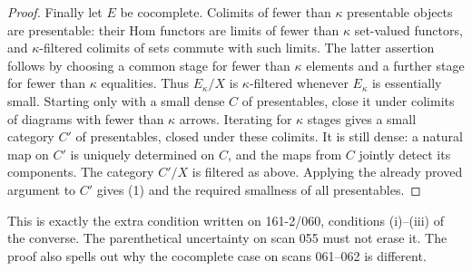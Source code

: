 \begin{proof}
Finally let $E$ be cocomplete.  Colimits of fewer than $\kappa$
presentable objects are presentable: their Hom functors are limits of
fewer than $\kappa$ set-valued functors, and $\kappa$-filtered colimits
of sets commute with such limits.  The latter assertion follows by
choosing a common stage for fewer than $\kappa$ elements and a further
stage for fewer than $\kappa$ equalities.  Thus $E_\kappa/X$ is
$\kappa$-filtered whenever $E_\kappa$ is essentially small.
Starting only with a small dense $C$ of presentables, close it under
colimits of diagrams with fewer than $\kappa$ arrows.  Iterating for
$\kappa$ stages gives a small category $C'$ of presentables, closed
under these colimits.  It is still dense: a natural map on $C'$ is
uniquely determined on $C$, and the maps from $C$ jointly detect its
components.  The category $C'/X$ is filtered as above.  Applying the
already proved argument to $C'$ gives (1) and the required smallness
of all presentables.
\end{proof}

This is exactly the extra condition written on 161-2/060, conditions
(i)--(iii) of the converse.  The parenthetical uncertainty on scan 055
must not erase it.  The proof also spells out why the cocomplete case
on scans 061--062 is different.

